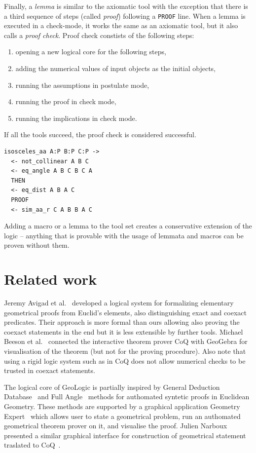 \documentclass[runningheads]{llncs}
\begin{document}
Finally, a \emph{lemma} is similar to the axiomatic tool with the
exception that there is a third sequence of steps
(called \emph{proof}) following a \texttt{PROOF} line. When a lemma is
executed in a check-mode, it works the same as an axiomatic tool, but
it also calls a \emph{proof check}.
Proof check constists of the following steps:
\begin{enumerate}
\item opening a new logical core for the following steps,
\item adding the numerical values of input objects as the initial objects,
\item running the assumptions in postulate mode,
\item running the proof in check mode,
\item running the implications in check mode.
\end{enumerate}
If all the tools succeed, the proof check is considered successful.

\begin{verbatim}
isosceles_aa A:P B:P C:P -> 
  <- not_collinear A B C
  <- eq_angle A B C B C A
  THEN
  <- eq_dist A B A C
  PROOF
  <- sim_aa_r C A B B A C
\end{verbatim}

Adding a macro or a lemma to the tool set creates a conservative
extension of the logic -- anything that is provable with the usage of
lemmata and macros can be proven without them.

\section{Related work}

Jeremy Avigad et al.~\cite{Coexact} developed a logical system for
formalizing elementary geometrical proofs from Euclid's elements, also
distinguishing exact and coexact predicates. Their approach is more
formal than ours allowing also proving the coexact statements in the
end but it is less extensible by further tools.
Michael Beeson et al.~\cite{GeoCoQ} connected the interactive theorem
prover CoQ with GeoGebra for visualisation of the theorem (but not for
the proving procedure). Also note that using a rigid logic system such
as in CoQ does not allow numerical checks to be trusted in coexact
statements.

The logical core of GeoLogic is partially inspired by General
Deduction Database~\cite{GDD} and Full Angle~\cite{FullAngle} methods for authomated syntetic proofs in
Euclidean Geometry.
These methods are supported by a graphical application
Geometry Expert~\cite{GEX} which allows user to state a
geometrical problem, run an authomated geometrical theorem prover on
it, and visualise the proof.
Julien Narboux presented a similar graphical interface for
construction of geometrical statement traslated to CoQ~\cite{GeoProof}.
\end{document}
